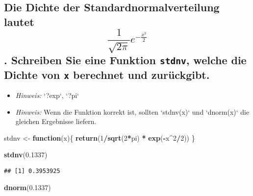\documentclass[12pt,a4paper]{article}
\newenvironment{Shaded}{\begin{snugshade}}{\end{snugshade}}
\newcommand{\ControlFlowTok}[1]{\textcolor[rgb]{0.13,0.29,0.53}{\textbf{#1}}}
\newcommand{\DecValTok}[1]{\textcolor[rgb]{0.00,0.00,0.81}{#1}}
\newcommand{\FloatTok}[1]{\textcolor[rgb]{0.00,0.00,0.81}{#1}}
\newcommand{\FunctionTok}[1]{\textcolor[rgb]{0.13,0.29,0.53}{\textbf{#1}}}
\newcommand{\NormalTok}[1]{#1}
\newcommand{\OtherTok}[1]{\textcolor[rgb]{0.56,0.35,0.01}{#1}}
\newcommand{\SpecialCharTok}[1]{\textcolor[rgb]{0.81,0.36,0.00}{\textbf{#1}}}
\begin{document}
\subsection{\texorpdfstring{Die Dichte der Standardnormalverteilung
lautet \[\displaystyle \frac{1}{\sqrt{2\pi}} e^{-\frac{x^2}{2}}\].
Schreiben Sie eine Funktion \texttt{stdnv}, welche die Dichte von
\texttt{x} berechnet und
zurückgibt.}{Die Dichte der Standardnormalverteilung lautet \textbackslash displaystyle \textbackslash frac\{1\}\{\textbackslash sqrt\{2\textbackslash pi\}\} e\^{}\{-\textbackslash frac\{x\^{}2\}\{2\}\}. Schreiben Sie eine Funktion stdnv, welche die Dichte von x berechnet und zurückgibt.}}\label{die-dichte-der-standardnormalverteilung-lautet-displaystyle-frac1sqrt2pi-e-fracx22.-schreiben-sie-eine-funktion-stdnv-welche-die-dichte-von-x-berechnet-und-zuruxfcckgibt.}

\begin{itemize}
  \item \textit{Hinweis:} `?exp`, `?pi`
  \item \textit{Hinweis:} Wenn die Funktion korrekt ist, sollten `stdnv(x)` und `dnorm(x)` die gleichen Ergebnisse liefern.
\end{itemize}

\begin{Shaded}
\begin{Highlighting}[]
\NormalTok{    stdnv }\OtherTok{\textless{}{-}} \ControlFlowTok{function}\NormalTok{(x)\{}
      \FunctionTok{return}\NormalTok{(}\DecValTok{1}\SpecialCharTok{/}\FunctionTok{sqrt}\NormalTok{(}\DecValTok{2}\SpecialCharTok{*}\NormalTok{pi) }\SpecialCharTok{*} \FunctionTok{exp}\NormalTok{(}\SpecialCharTok{{-}}\NormalTok{x}\SpecialCharTok{\^{}}\DecValTok{2}\SpecialCharTok{/}\DecValTok{2}\NormalTok{))}
\NormalTok{    \}}
    
    \FunctionTok{stdnv}\NormalTok{(}\FloatTok{0.1337}\NormalTok{)}
\end{Highlighting}
\end{Shaded}

\begin{verbatim}
## [1] 0.3953925
\end{verbatim}

\begin{Shaded}
\begin{Highlighting}[]
    \FunctionTok{dnorm}\NormalTok{(}\FloatTok{0.1337}\NormalTok{)}
\end{Highlighting}
\end{Shaded}
\end{document}
